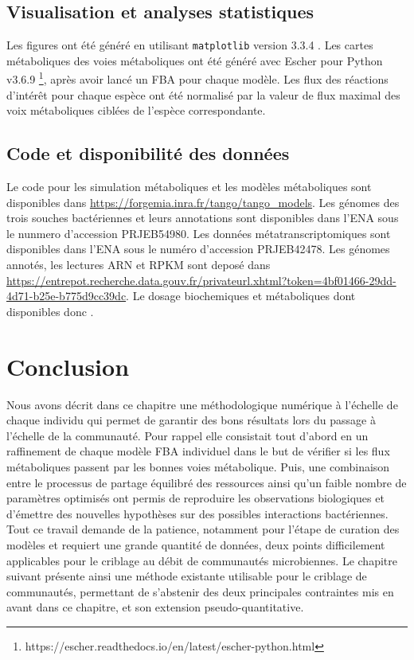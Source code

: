 \documentclass[../main.tex]{subfiles}
\begin{document}
\subsection{Visualisation et analyses statistiques}

Les figures ont été généré en utilisant \texttt{matplotlib} version 3.3.4 \citep{Hunter.2007}. Les cartes métaboliques des voies métaboliques ont été généré avec Escher \citep{King2015} pour Python v3.6.9 \citep{rossum2009} \footnote{https://escher.readthedocs.io/en/latest/escher-python.html}, après avoir lancé un FBA pour chaque modèle. Les flux des réactions d'intérêt pour chaque espèce ont été normalisé par la valeur de flux maximal des voix métaboliques ciblées de l'espèce correspondante. 

\subsection{Code et disponibilité des données}
Le code pour les simulation métaboliques et les modèles métaboliques sont disponibles dans \href{https://forgemia.inra.fr/tango/tango\_models}{https://forgemia.inra.fr/tango/tango\_models}. Les génomes des trois souches bactériennes et leurs annotations sont disponibles dans l'ENA sous le nunmero d'accession PRJEB54980. Les données métatranscriptomiques sont disponibles dans l'ENA sous le numéro d'accession PRJEB42478. Les génomes annotés, les lectures ARN et RPKM sont deposé dans \href{https://entrepot.recherche.data.gouv.fr/privateurl.xhtml?token=4bf01466-29dd-4d71-b25e-b775d9cc39dc}{https://entrepot.recherche.data.gouv.fr/privateurl.xhtml?token=4bf01466-29dd-4d71-b25e-b775d9cc39dc}. Le dosage biochemiques et métaboliques dont disponibles donc \citep{Cao2021}.


\section{Conclusion}
Nous avons décrit dans ce chapitre une méthodologique numérique à l'échelle de chaque individu qui permet de garantir des bons résultats lors du passage à l'échelle de la communauté. Pour rappel elle consistait tout d'abord en un raffinement de chaque modèle FBA individuel dans le but de vérifier si les flux métaboliques passent par les bonnes voies métabolique. Puis, une combinaison entre le processus de partage équilibré des ressources ainsi qu'un faible nombre de paramètres optimisés ont permis de reproduire les observations biologiques et d'émettre des nouvelles hypothèses sur des possibles interactions bactériennes. \\
Tout ce travail demande de la patience, notamment pour l'étape de curation des modèles et requiert une grande quantité de données, deux points difficilement applicables pour le criblage au débit de communautés microbiennes. Le chapitre suivant présente ainsi une méthode existante utilisable pour le criblage de communautés, permettant de s'abstenir des deux principales contraintes mis en avant dans ce chapitre, et son extension pseudo-quantitative.
\end{document}
